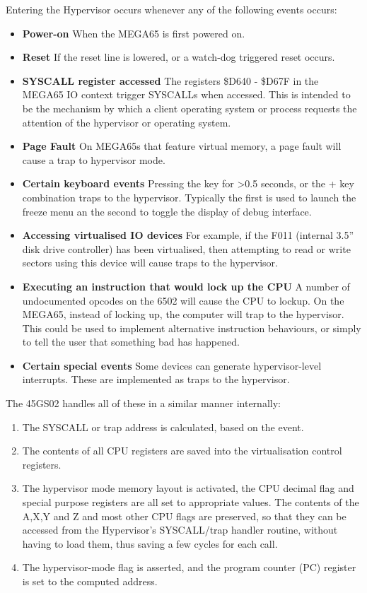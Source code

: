 Entering the Hypervisor occurs whenever any of the following events occurs:

\begin{itemize}
\item{\bf Power-on} When the MEGA65 is first powered on.
\item{\bf Reset} If the reset line is lowered, or a watch-dog triggered reset occurs.
\item{\bf SYSCALL register accessed} The registers \$D640 - \$D67F in the MEGA65 IO context trigger SYSCALLs when accessed.
  This is intended to be the mechanism by which a client operating system or process requests the attention of the hypervisor or operating system.
\item{\bf Page Fault} On MEGA65s that feature virtual memory, a page fault will cause a trap to hypervisor mode.
\item{\bf Certain keyboard events} Pressing the  key for >0.5 seconds, or the  +  key combination traps to the hypervisor.  Typically the first is used to launch the freeze menu an the second to toggle the display of debug interface.
\item{\bf Accessing virtualised IO devices} For example, if the F011 (internal 3.5'' disk drive controller) has been virtualised, then attempting to read or write sectors using this device will cause traps to the hypervisor.
  \item{\bf Executing an instruction that would lock up the CPU} A number of undocumented opcodes on the 6502 will cause the CPU to lockup.  On the MEGA65, instead of locking up, the computer will trap to the hypervisor.  This could be used to implement alternative instruction behaviours, or simply to tell the user that something bad has happened.
  \item{\bf Certain special events} Some devices can generate hypervisor-level interrupts. These are implemented as traps to the hypervisor.
\end{itemize}

The 45GS02 handles all of these in a similar manner internally:

\begin{enumerate}
\item The SYSCALL or trap address is calculated, based on the event.
\item The contents of all CPU registers are saved into the virtualisation control registers.
\item The hypervisor mode memory layout is activated, the CPU decimal flag and special purpose registers are all set to appropriate values.  The contents of the A,X,Y and Z and most other CPU flags are preserved, so that they can be accessed from the Hypervisor's SYSCALL/trap handler routine, without having to load them, thus saving a few cycles for each call.
\item The hypervisor-mode flag is asserted, and the program counter (PC) register is set to the computed address.
\end{enumerate}

